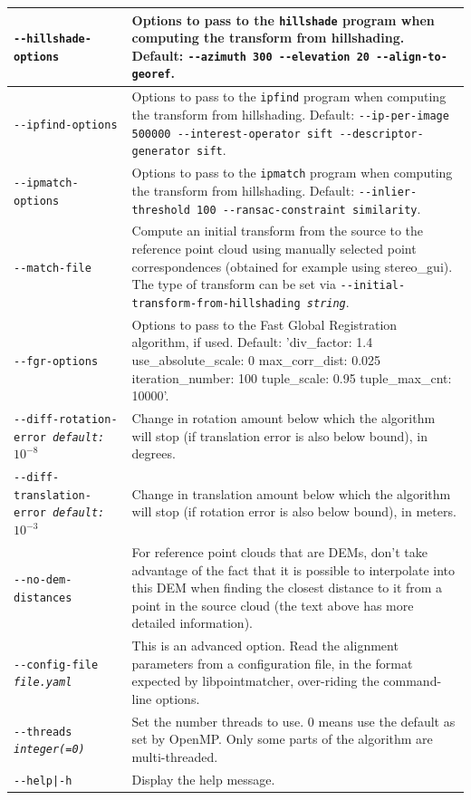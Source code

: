 \begin{longtable}{|p{8cm}|p{9cm}|}
\texttt{-\/-hillshade-options} & Options to pass to the \texttt{hillshade} program when computing the transform from hillshading. Default: \texttt{-\/-azimuth 300 -\/-elevation 20 -\/-align-to-georef}. \\ \hline

\texttt{-\/-ipfind-options} & Options to pass to the \texttt{ipfind} program when computing the transform from hillshading. Default: \texttt{-\/-ip-per-image 500000 -\/-interest-operator sift -\/-descriptor-generator sift}. \\ \hline

\texttt{-\/-ipmatch-options} & Options to pass to the \texttt{ipmatch} program when computing the transform from hillshading. Default: \texttt{-\/-inlier-threshold 100 -\/-ransac-constraint similarity}. \\ \hline

\texttt{-\/-match-file} & Compute an initial transform from the source to the reference point cloud using manually selected point correspondences (obtained for example using stereo\_gui).  The type of transform can be set via \texttt{-\/-initial-transform-from-hillshading \textit{string}}.\\ \hline

\texttt{-\/-fgr-options} & Options to pass to the Fast Global Registration algorithm, if used. Default: 'div\_factor: 1.4 use\_absolute\_scale: 0 max\_corr\_dist: 0.025 iteration\_number: 100 tuple\_scale: 0.95 tuple\_max\_cnt: 10000'. \\ \hline

\texttt{-\/-diff-rotation-error \textit{default: $10^{-8}$}} & Change in rotation amount below which the algorithm will stop (if translation error is also below bound), in degrees. \\ \hline
\texttt{-\/-diff-translation-error \textit{default: $10^{-3}$}} & Change in translation amount below which the algorithm will stop (if rotation error is also below bound), in meters. \\ \hline

\texttt{-\/-no-dem-distances} & For reference point clouds that are DEMs, don't take advantage of the fact that it is possible to interpolate into this DEM when finding the closest distance to it from a point in the source cloud (the text above has more detailed information). \\ \hline

\texttt{-\/-config-file \textit{file.yaml}} & This is an advanced
option. Read the alignment parameters from a configuration file, in the
format expected by libpointmatcher, over-riding the command-line options.\\ \hline

\texttt{-\/-threads \textit{integer(=0)}} & Set the number threads to
use. 0 means use the default as set by OpenMP. Only some parts of the algorithm are multi-threaded.\\ \hline

\texttt{-\/-help|-h} & Display the help message.\\ \hline
\end{longtable}

